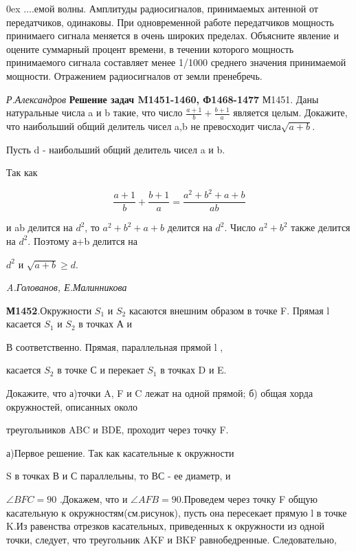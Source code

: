 \newpage

\pagestyle {fancy}
\fancyhf{}
\begin{multicols}{2}

\setlength { \parindent } { 0ex }
....емой волны. Амплитуды радиосигналов, принимаемых антенной от передатчиков, одинаковы. При одновременной работе передатчиков мощность принимаего сигнала меняется в очень широких пределах. Объясните явление и оцените суммарный процент времени, в течении которого мощность принимаемого сигнала составляет менее 1/1000 среднего значения принимаемой мощности. Отражением радиосигналов от земли пренебречь.

\textit{Р.Александров}
\vspace { 3mm }
\textbf{Решение задач M1451-1460, Ф1468-1477}
М1451. Даны натуральные числа a и b такие, что число  $\frac {a+1} { b } + \frac{b+1}{a}$ является целым. Докажите, что наибольший общий делитель чисел a,b не превосходит числа$\sqrt{a+b}$.

Пусть d - наибольший общий делитель чисел a и b.

Так как

$$\frac {a+1} { b } + \frac{b+1}{a} = \frac{a ^ 2 + b ^2 +a +b}{ab}$$

и ab делится на $d^2$, то  $a^2+b^2+a+b$ делится на $d^2$. Число $a^2+b^2$ также делится на $d^2$. Поэтому а+b делится на

$d^2$ и $ \sqrt{a+b} \geq d$.

\textit{A.Голованов, Е.Малинникова}

\vspace { 3mm }

\textbf{М1452}.Окружности $S_ 1$ и $S_ 2$ касаются внешним образом в точке F. Прямая l касается $S_ 1$ и $S_ 2$ в точках А и

В соответственно. Прямая, параллельная прямой l ,

касается $S_ 2$ в точке С и перекает $S_ 1$ в точках D и E.

Докажите, что а)точки A, F и C лежат на одной прямой; б) общая хорда окружностей, описанных около

треугольников ABC и BDЕ, проходит через точку F.

\vspace { 3mm }

а)Первое решение. Так как касательные к окружности

S в точках В и С параллельны, то ВС - ее диаметр, и

$\angle{BFC} = 90$ .Докажем, что и $\angle{AFB} = 90$.Проведем через точку F общую касательную к окружностям(см.рисунок), пусть она пересекает прямую l в точке K.Из равенства отрезков касательных, приведенных к окружности из одной точки, следует, что треугольник AKF и BKF равнобедренные. Следовательно,


\end{multicols}
